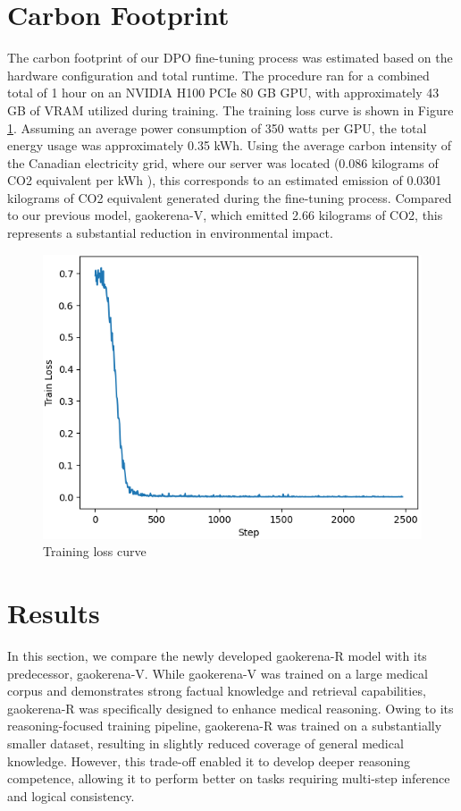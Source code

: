 \documentclass[conference]{IEEEtran}
\begin{document}
          \section{Carbon Footprint}
The carbon footprint of our DPO fine-tuning process was estimated based on the hardware configuration and total runtime. The procedure ran for a combined total of 1 hour on an NVIDIA H100 PCIe 80 GB GPU, with approximately 43 GB of VRAM utilized during training. The training loss curve is shown in Figure \ref{fig3}. Assuming an average power consumption of 350 watts per GPU, the total energy usage was approximately 0.35 kWh. Using the average carbon intensity of the Canadian electricity grid, where our server was located (0.086 kilograms of CO2 equivalent per kWh \cite{b24}), this corresponds to an estimated emission of 0.0301 kilograms of CO2 equivalent generated during the fine-tuning process. Compared to our previous model, gaokerena-V, which emitted 2.66 kilograms of CO2, this represents a substantial reduction in environmental impact.\cite{b25}


\begin{figure}[h]
    \centering
    \includegraphics[width=0.8\linewidth]{fig3.png}
    \caption{Training loss curve}
    \label{fig3}
\end{figure}
          \section{Results}
In this section, we compare the newly developed gaokerena-R model with its predecessor, gaokerena-V. While gaokerena-V was trained on a large medical corpus and demonstrates strong factual knowledge and retrieval capabilities, gaokerena-R was specifically designed to enhance medical reasoning. Owing to its reasoning-focused training pipeline, gaokerena-R was trained on a substantially smaller dataset, resulting in slightly reduced coverage of general medical knowledge. However, this trade-off enabled it to develop deeper reasoning competence, allowing it to perform better on tasks requiring multi-step inference and logical consistency.  
\end{document}
